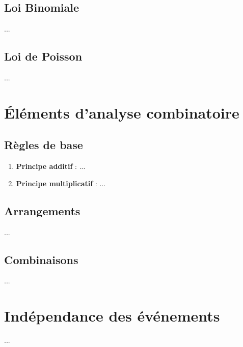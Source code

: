 \documentclass[a4paper,12pt]{article}
\begin{document}
\subsection{Loi Binomiale}
...

\subsection{Loi de Poisson}
...

\section{Éléments d'analyse combinatoire}

\subsection{Règles de base}
\begin{enumerate}
    \item \textbf{Principe additif} : ...
    \item \textbf{Principe multiplicatif} : ...
\end{enumerate}

\subsection{Arrangements}
...

\subsection{Combinaisons}
...

\section{Indépendance des événements}
...
\end{document}
